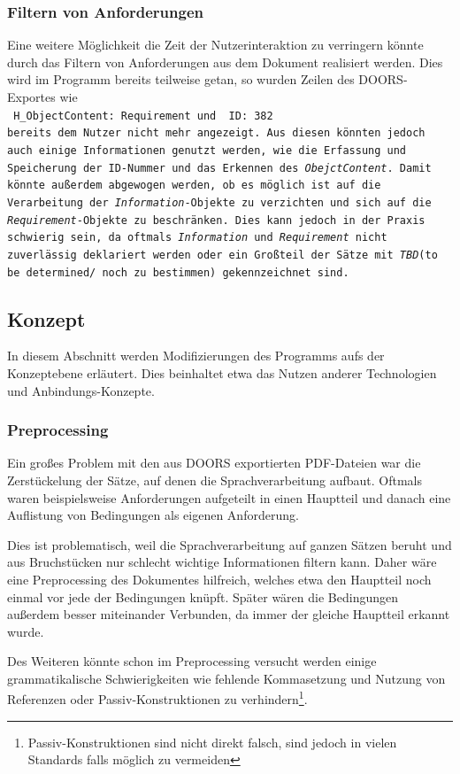 \documentclass[12pt]{report}
\begin{document}
\subsubsection{Filtern von Anforderungen}
Eine weitere Möglichkeit die Zeit der Nutzerinteraktion zu verringern könnte durch das Filtern von Anforderungen aus dem Dokument realisiert werden. Dies wird im Programm bereits teilweise getan, so wurden Zeilen des DOORS-Exportes wie\\
\tt
H\_ObjectContent: Requirement
\rm 
und 
\tt
ID: 382
\rm\\
bereits dem Nutzer nicht mehr angezeigt. Aus diesen könnten jedoch auch einige Informationen genutzt werden, wie die Erfassung und Speicherung der ID-Nummer und das Erkennen des \textit{ObejctContent}. Damit könnte außerdem abgewogen werden, ob es möglich ist auf die Verarbeitung der \textit{Information}-Objekte zu verzichten und sich auf die \textit{Requirement}-Objekte zu beschränken. Dies kann jedoch in der Praxis schwierig sein, da oftmals \textit{Information} und \textit{Requirement} nicht zuverlässig deklariert werden oder ein Großteil der Sätze mit \textit{TBD}(to be determined/ noch zu bestimmen) gekennzeichnet sind.
\subsection{Konzept}
In diesem Abschnitt werden Modifizierungen des Programms aufs der Konzeptebene erläutert. Dies beinhaltet etwa das Nutzen anderer Technologien und Anbindungs-Konzepte. 
\subsubsection{Preprocessing}
Ein großes Problem mit den aus DOORS exportierten PDF-Dateien war die Zerstückelung der Sätze, auf denen die Sprachverarbeitung aufbaut. Oftmals waren beispielsweise Anforderungen aufgeteilt in einen Hauptteil und danach eine Auflistung von Bedingungen als eigenen Anforderung.

Dies ist problematisch, weil die Sprachverarbeitung auf ganzen Sätzen beruht und aus Bruchstücken nur schlecht wichtige Informationen filtern kann. Daher wäre eine Preprocessing des Dokumentes hilfreich, welches etwa den Hauptteil noch einmal vor jede der Bedingungen knüpft. Später wären die Bedingungen außerdem besser miteinander Verbunden, da immer der gleiche Hauptteil erkannt wurde.

Des Weiteren könnte schon im Preprocessing versucht werden einige grammatikalische Schwierigkeiten wie fehlende Kommasetzung und Nutzung von Referenzen oder Passiv-Konstruktionen zu verhindern\footnote{Passiv-Konstruktionen sind nicht direkt falsch, sind jedoch in vielen Standards falls möglich zu vermeiden}. 
\end{document}
